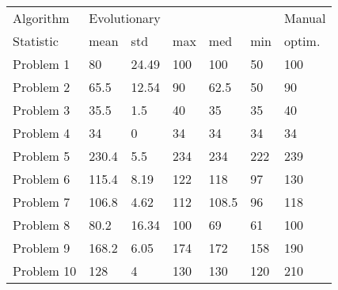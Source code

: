 \begin{tabular}{lllllll}
\toprule
Algorithm & \multicolumn{5}{l}{Evolutionary} & Manual \\
Statistic &         mean &    std &  max &    med &  min & optim. \\
\midrule
Problem 1  &           80 &  24.49 &  100 &    100 &   50 &    100 \\
Problem 2  &         65.5 &  12.54 &   90 &   62.5 &   50 &     90 \\
Problem 3  &         35.5 &    1.5 &   40 &     35 &   35 &     40 \\
Problem 4  &           34 &      0 &   34 &     34 &   34 &     34 \\
Problem 5  &        230.4 &    5.5 &  234 &    234 &  222 &    239 \\
Problem 6  &        115.4 &   8.19 &  122 &    118 &   97 &    130 \\
Problem 7  &        106.8 &   4.62 &  112 &  108.5 &   96 &    118 \\
Problem 8  &         80.2 &  16.34 &  100 &     69 &   61 &    100 \\
Problem 9  &        168.2 &   6.05 &  174 &    172 &  158 &    190 \\
Problem 10 &          128 &      4 &  130 &    130 &  120 &    210 \\
\bottomrule
\end{tabular}
